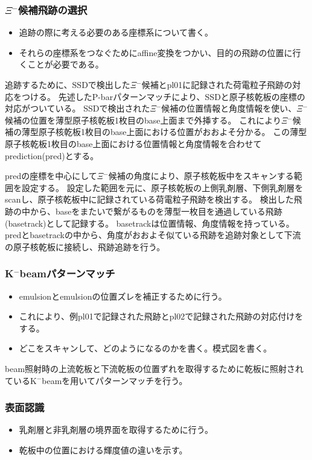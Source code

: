 \documentclass[12pt,a4paper]{jarticle}
\begin{document}
\subsubsection{$\Xi$$^-$候補飛跡の選択}
\begin{itemize}
    \item 追跡の際に考える必要のある座標系について書く。
    \item それらの座標系をつなぐためにaffine変換をつかい、目的の飛跡の位置に行くことが必要である。
\end{itemize}
追跡するために、SSDで検出した$\Xi$$^-$候補とpl01に記録された荷電粒子飛跡の対応をつける。
先述したP-barパターンマッチにより、SSDと原子核乾板の座標の対応がついている。
SSDで検出された$\Xi$$^-$候補の位置情報と角度情報を使い、$\Xi$$^-$候補の位置を薄型原子核乾板1枚目のbase上面まで外挿する。
これにより$\Xi$$^-$候補の薄型原子核乾板1枚目のbase上面における位置がおおよそ分かる。
この薄型原子核乾板1枚目のbase上面における位置情報と角度情報を合わせてprediction(pred)とする。
\par
predの座標を中心にして$\Xi$$^-$候補の角度により、原子核乾板中をスキャンする範囲を設定する。
設定した範囲を元に、原子核乾板の上側乳剤層、下側乳剤層をscanし、原子核乾板中に記録されている荷電粒子飛跡を検出する。
検出した飛跡の中から、baseをまたいで繋がるものを薄型一枚目を通過している飛跡(basetrack)として記録する。
basetrackは位置情報、角度情報を持っている。
predとbasetrackの中から、角度がおおよそ似ている飛跡を追跡対象として下流の原子核乾板に接続し、飛跡追跡を行う。
\subsubsection{K$^-$beamパターンマッチ}
\begin{itemize}
    \item emulsionとemulsionの位置ズレを補正するために行う。
    \item これにより、例pl01で記録された飛跡とpl02で記録された飛跡の対応付けをする。
    \item どこをスキャンして、どのようになるのかを書く。模式図を書く。
\end{itemize}
beam照射時の上流乾板と下流乾板の位置ずれを取得するために乾板に照射されているK$^-$beamを用いてパターンマッチを行う。
\subsubsection{表面認識}
\begin{itemize}
    \item 乳剤層と非乳剤層の境界面を取得するために行う。
    \item 乾板中の位置における輝度値の違いを示す。
\end{itemize}
\end{document}
